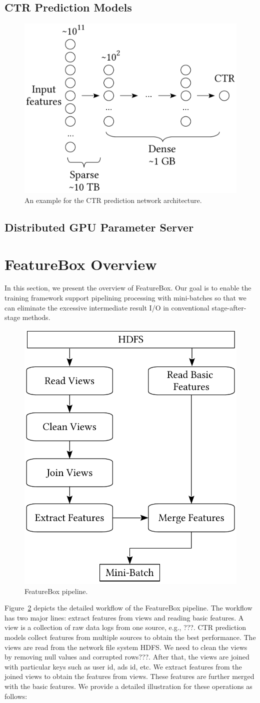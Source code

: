 \documentclass[conference]{IEEEtran}
\begin{document}
\subsection{CTR Prediction Models}

\begin{figure}[htbp]
\centering
\includegraphics[width=.35\textwidth]{figs/ctr}
\caption{An example for the CTR prediction network architecture.}
\label{fig:ctr}
\end{figure}

\subsection{Distributed GPU Parameter Server}

\section{FeatureBox Overview}
In this section, we present the overview of FeatureBox. Our goal is to enable the training framework support pipelining processing with mini-batches so that we can eliminate the excessive intermediate result I/O in conventional stage-after-stage methods.

\begin{figure}[htbp]
\centering
\includegraphics[width=.33\textwidth]{figs/pipeline}
\caption{FeatureBox pipeline.}\label{fig:pipeline}
\end{figure}

Figure~\ref{fig:pipeline} depicts the detailed workflow of the FeatureBox pipeline. The workflow has two major lines: extract features from views and reading basic features. 
A view is a collection of raw data logs from one source, e.g., ???. CTR prediction models collect features from multiple sources to obtain the best performance. The views are read from the network file system HDFS. We need to clean the views by removing null values and corrupted rows???. After that, the views are joined with particular keys such as user id, ads id, etc. We extract features from the joined views to obtain the features from views. These features are further merged with the basic features. We provide a detailed illustration for these operations as follows:
\end{document}
